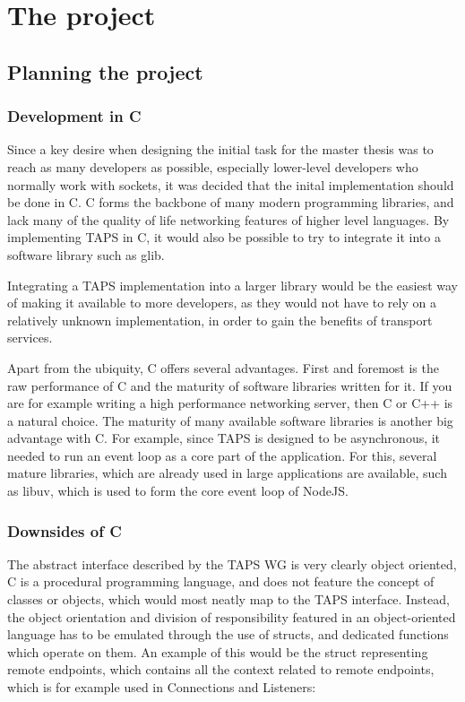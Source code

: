 \part{The project}                    %
\chapter{Planning the project} \label{planningTheProject}
\section{Development in C}
Since a key desire when designing the initial task for
the master thesis was to reach as many developers as possible,
especially lower-level developers who normally work with sockets,
it was decided that the inital implementation should be done in C.
C forms the backbone of many modern programming libraries, and lack
many of the quality of life networking features of higher level languages.
By implementing TAPS in C, it would also be possible to try to integrate it
into a software library such as glib. 

Integrating a TAPS implementation into a larger library would be the easiest
way of making it available to more developers, as they would not have to
rely on a relatively unknown implementation, in order to gain the benefits
of transport services.

Apart from the ubiquity, C offers several advantages. First and foremost
is the raw performance of C and the maturity of software libraries written
for it. If you are for example writing a high performance networking server,
then C or C++ is a natural choice. The maturity of many available software libraries is
another big advantage with C. For example, since TAPS is designed to be asynchronous,
it needed to run an event loop as a core part of the application. For this,
several mature libraries, which are already used in large applications are
available, such as libuv, which is used to form the core event loop of NodeJS. \cite{Libuv2025}

\section{Downsides of C}
The abstract interface described by the TAPS WG is very clearly object
oriented, C is a procedural programming language, and does not feature
the concept of classes or objects, which would most neatly map to the
TAPS interface. Instead, the object orientation and division of responsibility
featured in an object-oriented language has to be emulated through the use of
structs, and dedicated functions which operate on them. An example of this
would be the struct representing remote endpoints, which contains all the
context related to remote endpoints, which is for example used
in Connections and Listeners:

